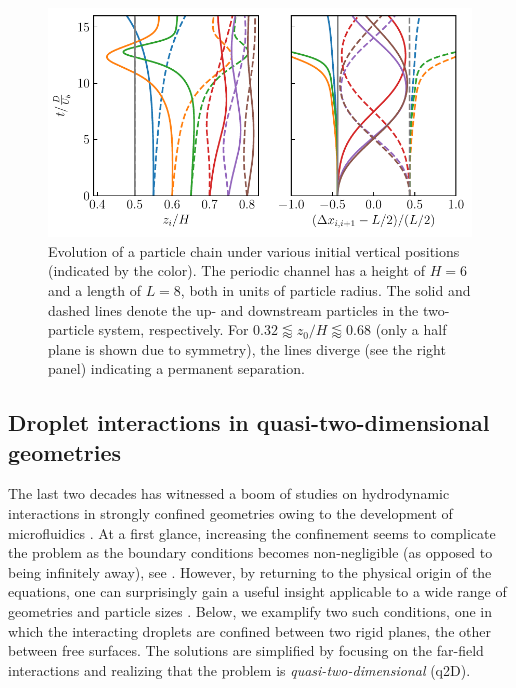 \begin{figure}%
  \centering
  \includegraphics[width=0.9\columnwidth]{H3.pdf}
  \caption{Evolution of a particle chain under various initial vertical positions (indicated by the color). The periodic channel has a height of $H=6$ and a length of $L=8$, both in units of particle radius. The solid and dashed lines denote the up- and downstream particles in the two-particle system, respectively. For $0.32 \lessapprox z_0/H \lessapprox 0.68$ (only a half plane is shown due to symmetry), the lines diverge (see the right panel) indicating a permanent separation.}
  \label{fig:xover}
\end{figure}



\subsection{Droplet interactions in quasi-two-dimensional geometries}
\label{subsec:drop-confined}

The last two decades has witnessed a boom of studies on hydrodynamic interactions in strongly confined geometries owing to the development of microfluidics \citep{Cui_etal_2002, Cui2004, tlusty, Davit_2008, q2d_Beatus}. At a first glance, increasing the confinement seems to complicate the problem as the boundary conditions becomes non-negligible (as opposed to being infinitely away), see \eg \cite{LironMochon, Fouxon_Rubinstein2019}. However, by returning to the physical origin of the equations, one can surprisingly gain a useful insight applicable to a wide range of geometries and particle sizes \citep{Diamant_2005}. Below, we examplify two such conditions, one in which the interacting droplets are confined between two rigid planes, the other between free surfaces. The solutions are simplified by focusing on the far-field interactions and realizing that the problem is \emph{quasi-two-dimensional} (q2D). 

